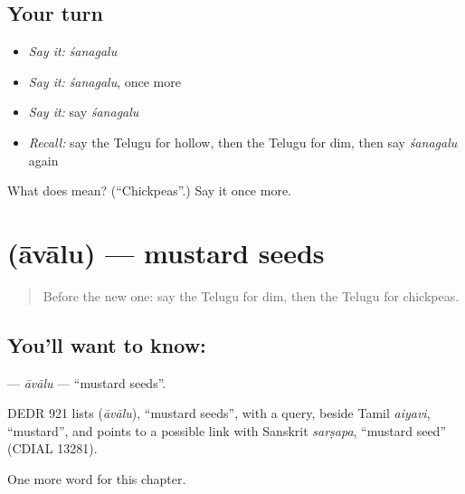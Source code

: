 \subsection*{Your turn}
\begin{itemize}
\raggedright
  \item \emph{Say it:} \emph{śanagalu}
  \item \emph{Say it:} \emph{śanagalu}, once more
  \item \emph{Say it:} say \emph{śanagalu}
  \item \emph{Recall:} say the Telugu for hollow, then the Telugu for dim, then say \emph{śanagalu} again
\end{itemize}

\begin{tcolorbox}[breakable,colback=teal!4,colframe=teal!35!black,title={Before you move on}]
What does  mean? (\textquotedblleft{}Chickpeas\textquotedblright{}.) Say it once more.
\end{tcolorbox}
\section[\texorpdfstring{\te{ఆవాలు} (āvālu)}{ఆవాలు (āvālu)}]{ (āvālu) — mustard seeds}

\label{lesson:TE-C299-avalu}



\begin{quote}
Before the new one: say the Telugu for dim, then the Telugu for chickpeas.
\end{quote}

\subsection*{You'll want to know: }
\textbf{} — \emph{āvālu} — \textquotedblleft{}mustard seeds\textquotedblright{}.

\begin{cousinweb}
DEDR 921 lists \textbf{} (\emph{āvālu}), \textquotedblleft{}mustard seeds\textquotedblright{}, with a query, beside Tamil \emph{aiyavi}, \textquotedblleft{}mustard\textquotedblright{}, and points to a possible link with Sanskrit \emph{sarṣapa}, \textquotedblleft{}mustard seed\textquotedblright{} (CDIAL 13281).
\end{cousinweb}

\begin{grammarlens}[title={What you've built}]
One more word for this chapter.
\end{grammarlens}

